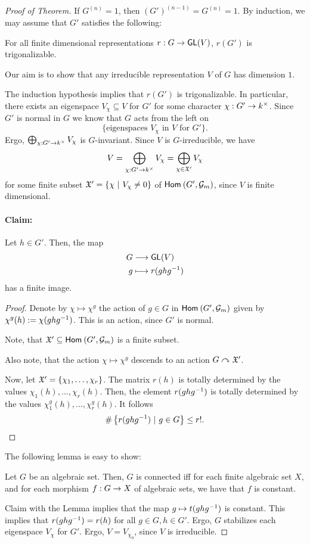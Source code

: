 \begin{proof}[Proof of Theorem]
If $G^{(n)} = 1$, then $(G')^{(n-1)} = G^{(n)} = 1$. By induction, we may assume that $G'$ satisfies the following:

For all finite dimensional representations $r : G \overset{}{\rightarrow} \textsf{GL}(V)$, $r(G')$ is trigonalizable.



Our aim is to show that any irreducible representation $V$ of $G$ has dimension $1$.

The induction hypothesis implies that $r(G')$ is trigonalizable. In particular, there exists an eigenspace $V_\chi \subseteq V$ for $G'$ for some character $\chi : G' \overset{}{\rightarrow} k^\times$. Since $G'$ is normal in $G$ we know that $G$ acts from the left on
\[\{ \text{eigenspaces }V_\chi \text{ in } V \text{ for } G' \}.\] 
Ergo, $\bigoplus_{\chi : G' \overset{}{\rightarrow} k^\times}V_\chi$ is $G$-invariant.
Since $V$ is $G$-irreducible, we have
\[ V = \bigoplus_{\chi : G' \overset{}{\rightarrow} k^\times}V_\chi = \bigoplus_{\chi \in \mathfrak{X}'}V_\chi  \]
for some finite subset $\mathfrak{X}' = \left\lbrace\chi ~ | ~ V_\chi \neq 0\right\rbrace$ of $\textsf{Hom}_{}\left(G', \mathcal{G}_m\right)$, since $V$ is finite dimensional.

\paragraph{Claim:} Let $h \in G'$. Then, the map
\begin{align*}
G & \overset{}{\longrightarrow} \textsf{GL}(V)\\
g & \longmapsto r(ghg^{-1})
\end{align*}
has a finite image.
\begin{proof}
	Denote by $\chi \mapsto \chi^g$ the action of $g \in G$ in $\textsf{Hom}_{}\left(G', \mathcal{G}_m\right)$ given by $\chi^g(h) := \chi(ghg^{-1})$. This is an action, since $G'$ is normal.
	
	Note, that $\mathfrak{X}'\subseteq \textsf{Hom}_{}\left(G', \mathcal{G}_m\right)$ is a finite subset.
	
	Also note, that the action $\chi \mapsto \chi^g$ descends to an action $G\curvearrowright \mathfrak{X}' $.
	
	
	Now, let $\mathfrak{X}' = \{\chi_1,\ldots, \chi_r\}$. The matrix $r(h)$ is totally determined by the values $\chi_1(h), \ldots, \chi_r(h)$. Then, the element $r(ghg^{-1})$ is totally determined by the values $\chi_1^g(h), \ldots, \chi_r^g(h)$. It follows
	\[ \# \left\lbrace r(ghg^{-1}) ~ | ~ g \in G\right\rbrace \leq r!. \]
\end{proof}
The following lemma is easy to show:
\begin{lemma}
Let $G$ be an algebraic set. Then, $G$ is connected iff for each finite algebraic set $X$, and for each morphism $f : G \overset{}{\rightarrow} X$ of algebraic sets, we have that $f$ is constant.
\end{lemma}
Claim with the Lemma implies that the map $g \mapsto t(ghg^{-1})$ is constant. This implies that $r(ghg^{-1}) = r(h)$ for all $g \in G, h \in G'$. Ergo, $G$ stabilizes each eigenspace $V_\chi$ for $G'$. Ergo, $V = V_{\chi_0}$, since $V$ is irreducible.
\end{proof}

